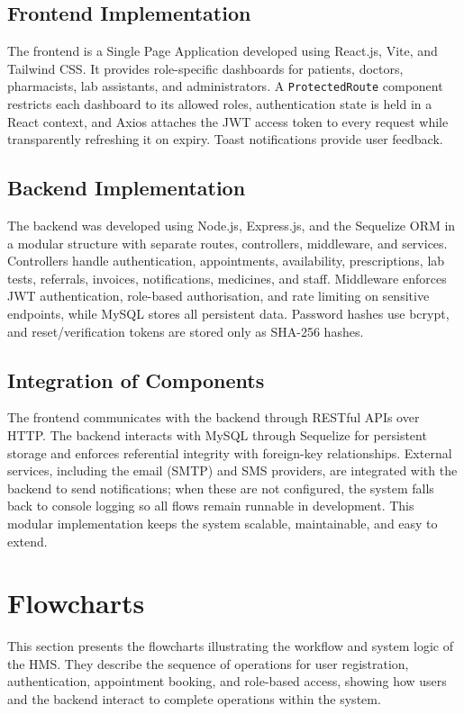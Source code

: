 \documentclass[12pt,a4paper]{report}
\begin{document}
\subsection{Frontend Implementation}
The frontend is a Single Page Application developed using React.js, Vite, and Tailwind
CSS. It provides role-specific dashboards for patients, doctors, pharmacists, lab
assistants, and administrators. A \texttt{ProtectedRoute} component restricts each
dashboard to its allowed roles, authentication state is held in a React context, and
Axios attaches the JWT access token to every request while transparently refreshing it
on expiry. Toast notifications provide user feedback.

\subsection{Backend Implementation}
The backend was developed using Node.js, Express.js, and the Sequelize ORM in a modular
structure with separate routes, controllers, middleware, and services. Controllers
handle authentication, appointments, availability, prescriptions, lab tests, referrals,
invoices, notifications, medicines, and staff. Middleware enforces JWT authentication,
role-based authorisation, and rate limiting on sensitive endpoints, while MySQL stores
all persistent data. Password hashes use bcrypt, and reset/verification tokens are
stored only as SHA-256 hashes.

\subsection{Integration of Components}
The frontend communicates with the backend through RESTful APIs over HTTP. The backend
interacts with MySQL through Sequelize for persistent storage and enforces referential
integrity with foreign-key relationships. External services, including the email (SMTP)
and SMS providers, are integrated with the backend to send notifications; when these are
not configured, the system falls back to console logging so all flows remain runnable in
development. This modular implementation keeps the system scalable, maintainable, and
easy to extend.

\section{Flowcharts}
This section presents the flowcharts illustrating the workflow and system logic of the
HMS. They describe the sequence of operations for user registration, authentication,
appointment booking, and role-based access, showing how users and the backend interact
to complete operations within the system.
\end{document}
